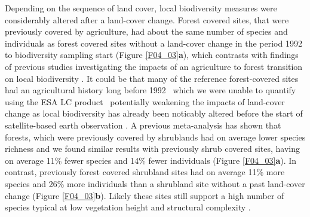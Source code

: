 Depending on the sequence of land cover, local biodiversity measures were considerably altered after a land-cover change. Forest covered sites, that were previously covered by agriculture, had about the same number of species and individuals as forest covered sites without a land-cover change in the period 1992 to biodiversity sampling start (Figure \ref{F04_03}\textbf{a}), which contrasts with findings of previous studies investigating the impacts of an agriculture to forest transition on local biodiversity \citep{Bellemare2002,Hermy2007,Dyer2010}. It could be that many of the reference forest-covered sites had an agricultural history long before 1992 \textendash\ which we were unable to quantify using the ESA LC product \textendash\ potentially weakening the impacts of land-cover change as local biodiversity has already been noticably altered before the start of satellite-based earth observation \citep{Ellis2010,McMichael2017}. A previous meta-analysis has shown that forests, which were previously covered by shrublands had on average lower species richness \citep{Bremer2010} and we found similar results with previously shrub covered sites, having on average 11\% fewer species and 14\% fewer individuals (Figure \ref{F04_03}\textbf{a}). In contrast, previously forest covered shrubland sites had on average 11\% more species and 26\% more individuals than a shrubland site without a past land-cover change (Figure \ref{F04_03}\textbf{b}). Likely these sites still support a high number of species typical at low vegetation height and structural complexity \citep{Chazdon2016}. 


